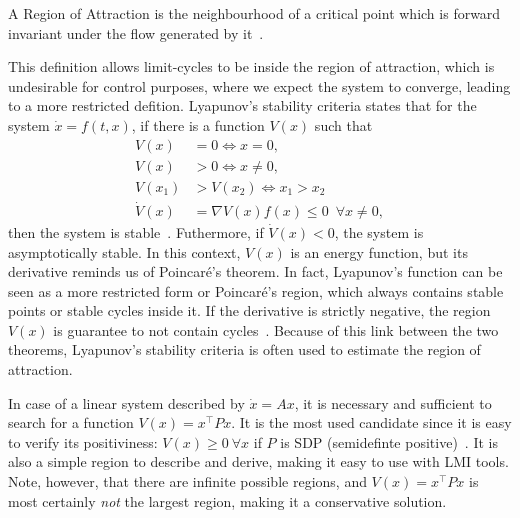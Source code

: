 \begin{definition}
  A Region of Attraction is the neighbourhood of a critical point which is
  forward invariant under the flow generated by it~\parencite[178]{milnor:on}.
\end{definition}

This definition allows limit-cycles to be inside the region of attraction, which
is undesirable for control purposes, where we expect the system to converge,
leading to a more restricted defition. Lyapunov's stability criteria states that
for the system \(\dot{x} = f(t, x)\), if there is a function \(V(x)\) such that
%
\begin{align}
  V(x)       & = 0 \iff x = 0,                                       \\
  V(x)       & > 0 \iff x \ne 0,                                     \\
  V(x_{1})   & >V(x_{2}) \iff x_{1} > x_{2}                          \\
  \dot{V}(x) & = \nabla{}V(x)f(x) \le 0 \phantom{0} \forall x \ne 0,
\end{align}
%
then the system is stable~\parencite{chen:linear,hespanha:linear}. Futhermore,
if \(\dot{V}(x)<0\), the system is asymptotically stable. In this context,
\(V(x)\) is an energy function, but its derivative reminds us of Poincaré's
theorem. In fact, Lyapunov's function can be seen as a more restricted form or
Poincaré's region, which always contains stable points or stable cycles inside
it. If the derivative is strictly negative, the region \(V(x)\) is guarantee to
not contain cycles~\parencite{chen:linear}. Because of this link between the two
theorems, Lyapunov's stability criteria is often used to estimate the region of
attraction.

In case of a linear system described by \(\dot{x} = Ax\), it is necessary and
sufficient to search for a function \(V(x)=x^{\top}Px\). It is the most used
candidate since it is easy to verify its positiviness: \(V(x)\ge{}0~\forall{}x\) if
\(P\) is SDP (semidefinte positive)~\parencite{bochnak.coste.ea:real}. It is
also a simple region to describe and derive, making it easy to use with LMI
tools. Note, however, that there are infinite possible regions, and
\(V(x)=x^{\top}Px\) is most certainly \textit{not} the largest region, making it a
conservative solution.
